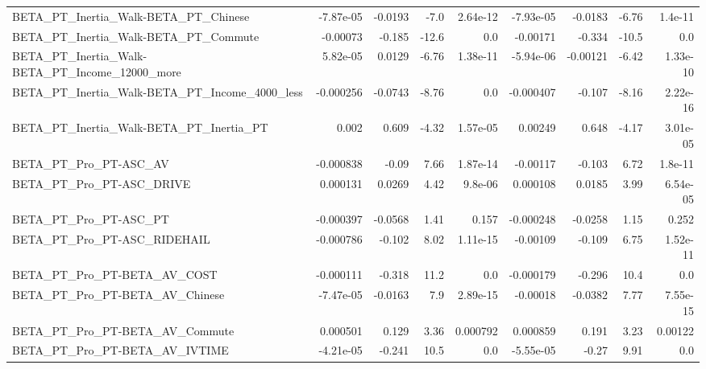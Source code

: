 \begin{tabular}{lrrrrrrrr}
BETA\_PT\_Inertia\_Walk-BETA\_PT\_Chinese               &   -7.87e-05 &      -0.0193 &     -7.0 & 2.64e-12 &  -7.93e-05 &     -0.0183 &        -6.76 &       1.4e-11 \\
BETA\_PT\_Inertia\_Walk-BETA\_PT\_Commute               &    -0.00073 &       -0.185 &    -12.6 &      0.0 &   -0.00171 &      -0.334 &        -10.5 &           0.0 \\
BETA\_PT\_Inertia\_Walk-BETA\_PT\_Income\_12000\_more     &    5.82e-05 &       0.0129 &    -6.76 & 1.38e-11 &  -5.94e-06 &    -0.00121 &        -6.42 &      1.33e-10 \\
BETA\_PT\_Inertia\_Walk-BETA\_PT\_Income\_4000\_less      &   -0.000256 &      -0.0743 &    -8.76 &      0.0 &  -0.000407 &      -0.107 &        -8.16 &      2.22e-16 \\
BETA\_PT\_Inertia\_Walk-BETA\_PT\_Inertia\_PT            &       0.002 &        0.609 &    -4.32 & 1.57e-05 &    0.00249 &       0.648 &        -4.17 &      3.01e-05 \\
BETA\_PT\_Pro\_PT-ASC\_AV                              &   -0.000838 &        -0.09 &     7.66 & 1.87e-14 &   -0.00117 &      -0.103 &         6.72 &       1.8e-11 \\
BETA\_PT\_Pro\_PT-ASC\_DRIVE                           &    0.000131 &       0.0269 &     4.42 &  9.8e-06 &   0.000108 &      0.0185 &         3.99 &      6.54e-05 \\
BETA\_PT\_Pro\_PT-ASC\_PT                              &   -0.000397 &      -0.0568 &     1.41 &    0.157 &  -0.000248 &     -0.0258 &         1.15 &         0.252 \\
BETA\_PT\_Pro\_PT-ASC\_RIDEHAIL                        &   -0.000786 &       -0.102 &     8.02 & 1.11e-15 &   -0.00109 &      -0.109 &         6.75 &      1.52e-11 \\
BETA\_PT\_Pro\_PT-BETA\_AV\_COST                        &   -0.000111 &       -0.318 &     11.2 &      0.0 &  -0.000179 &      -0.296 &         10.4 &           0.0 \\
BETA\_PT\_Pro\_PT-BETA\_AV\_Chinese                     &   -7.47e-05 &      -0.0163 &      7.9 & 2.89e-15 &   -0.00018 &     -0.0382 &         7.77 &      7.55e-15 \\
BETA\_PT\_Pro\_PT-BETA\_AV\_Commute                     &    0.000501 &        0.129 &     3.36 & 0.000792 &   0.000859 &       0.191 &         3.23 &       0.00122 \\
BETA\_PT\_Pro\_PT-BETA\_AV\_IVTIME                      &   -4.21e-05 &       -0.241 &     10.5 &      0.0 &  -5.55e-05 &       -0.27 &         9.91 &           0.0 \\

\end{tabular}

